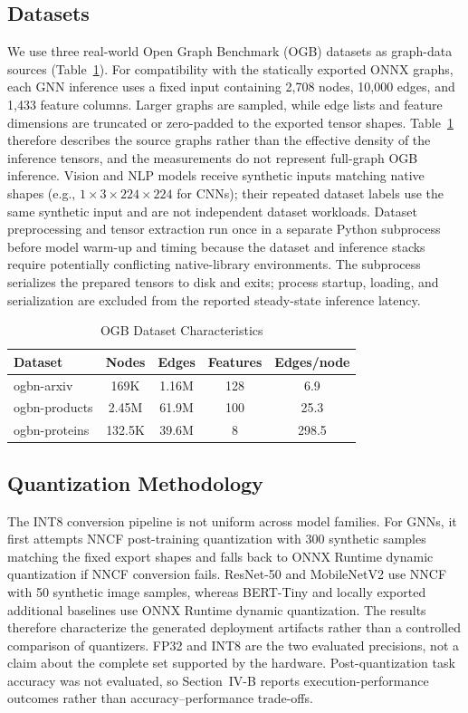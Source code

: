 \documentclass[conference]{IEEEtran}
\begin{document}
\subsection{Datasets}
We use three real-world Open Graph Benchmark (OGB) datasets \cite{hu2020open} as graph-data sources (Table~\ref{tab:datasets}). For compatibility with the statically exported ONNX graphs, each GNN inference uses a fixed input containing 2,708 nodes, 10,000 edges, and 1,433 feature columns. Larger graphs are sampled, while edge lists and feature dimensions are truncated or zero-padded to the exported tensor shapes. Table~\ref{tab:datasets} therefore describes the source graphs rather than the effective density of the inference tensors, and the measurements do not represent full-graph OGB inference. Vision and NLP models receive synthetic inputs matching native shapes (e.g., $1\times3\times224\times224$ for CNNs); their repeated dataset labels use the same synthetic input and are not independent dataset workloads. Dataset preprocessing and tensor extraction run once in a separate Python subprocess before model warm-up and timing because the dataset and inference stacks require potentially conflicting native-library environments. The subprocess serializes the prepared tensors to disk and exits; process startup, loading, and serialization are excluded from the reported steady-state inference latency.

\begin{table}[htbp]
\caption{OGB Dataset Characteristics}
\begin{center}
\begin{tabular}{lcccc}
\toprule
\textbf{Dataset} & \textbf{Nodes} & \textbf{Edges} & \textbf{Features} & \textbf{Edges/node} \\
\midrule
ogbn-arxiv    & 169K & 1.16M & 128 & 6.9 \\
ogbn-products & 2.45M & 61.9M & 100 & 25.3 \\
ogbn-proteins & 132.5K & 39.6M & 8 & 298.5 \\
\bottomrule
\end{tabular}
\label{tab:datasets}
\end{center}
\end{table}

\subsection{Quantization Methodology}
The INT8 conversion pipeline is not uniform across model families. For GNNs, it first attempts NNCF post-training quantization with 300 synthetic samples matching the fixed export shapes and falls back to ONNX Runtime dynamic quantization if NNCF conversion fails. ResNet-50 and MobileNetV2 use NNCF with 50 synthetic image samples, whereas BERT-Tiny and locally exported additional baselines use ONNX Runtime dynamic quantization. The results therefore characterize the generated deployment artifacts rather than a controlled comparison of quantizers. FP32 and INT8 are the two evaluated precisions, not a claim about the complete set supported by the hardware. Post-quantization task accuracy was not evaluated, so Section~IV-B reports execution-performance outcomes rather than accuracy--performance trade-offs.
\end{document}
